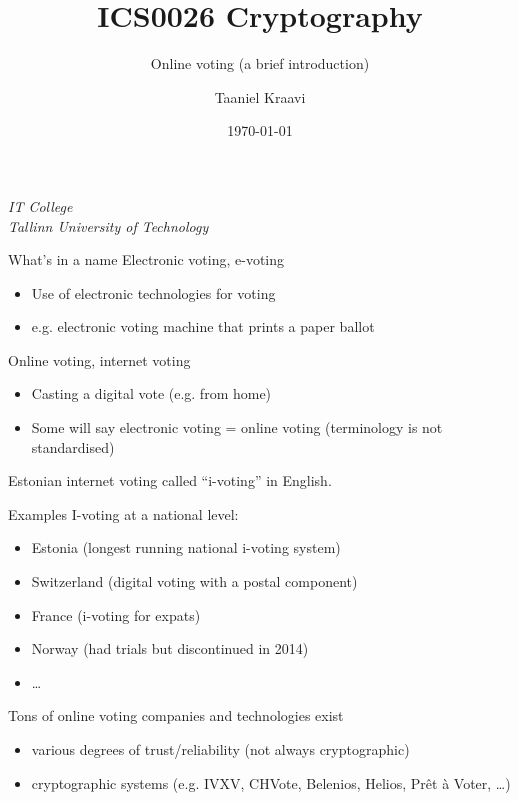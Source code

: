 \graphicspath{ {../../images/} }
\usetikzlibrary{positioning,calc,external}

\title{ICS0026 Cryptography}
\subtitle{Online voting (a brief introduction)}
\date{\today}
\author{Taaniel Kraavi}
\institute%
{%
  \textit{IT College}\\
  \textit{Tallinn University of Technology}
}


\begin{frame}
  \titlepage
\end{frame}

\begin{frame}{What's in a name}
  Electronic voting, e-voting
  \begin{itemize}[<+(1)->]
    \item Use of electronic technologies for voting
    \item e.g. electronic voting machine that prints a paper ballot
  \end{itemize}

  \pause
  Online voting, internet voting
  \begin{itemize}[<+(1)->]
    \item Casting a digital vote (e.g. from home)
    \item Some will say electronic voting = online voting (terminology is not standardised)
  \end{itemize}

  \pause
  Estonian internet voting called \enquote{i-voting} in English.
\end{frame}

\begin{frame}{Examples}
  I-voting at a national level:
  \begin{itemize}[<+(1)->]
    \item Estonia (longest running national i-voting system)
    \item Switzerland (digital voting with a postal component)
    \item France (i-voting for expats)
    \item Norway (had trials but discontinued in 2014)
    \item \dots
  \end{itemize}

  \pause
  Tons of online voting companies and technologies exist
  \begin{itemize}[<+(1)->]
    \item various degrees of trust/reliability (not always cryptographic)
    \item cryptographic systems (e.g. IVXV, CHVote, Belenios, Helios, Prêt à Voter, \dots)
  \end{itemize}
\end{frame}

